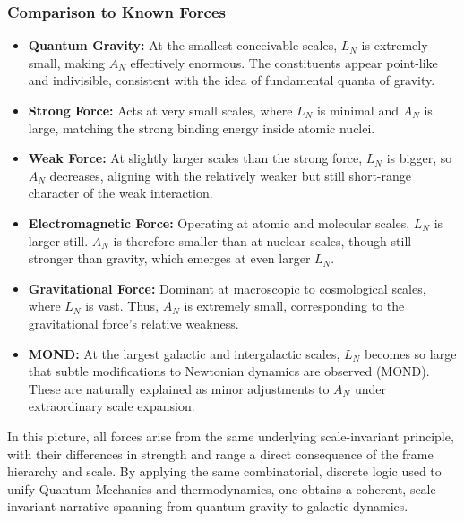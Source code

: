 \documentclass{article}
\begin{document}
\subsubsection*{Comparison to Known Forces}

\begin{itemize}
    \item \textbf{Quantum Gravity:}  
    At the smallest conceivable scales, $L_N$ is extremely small, making $A_N$ effectively enormous. The constituents appear point-like and indivisible, consistent with the idea of fundamental quanta of gravity.

    \item \textbf{Strong Force:}  
    Acts at very small scales, where $L_N$ is minimal and $A_N$ is large, matching the strong binding energy inside atomic nuclei.

    \item \textbf{Weak Force:}  
    At slightly larger scales than the strong force, $L_N$ is bigger, so $A_N$ decreases, aligning with the relatively weaker but still short-range character of the weak interaction.

    \item \textbf{Electromagnetic Force:}  
    Operating at atomic and molecular scales, $L_N$ is larger still. $A_N$ is therefore smaller than at nuclear scales, though still stronger than gravity, which emerges at even larger $L_N$.

    \item \textbf{Gravitational Force:}  
    Dominant at macroscopic to cosmological scales, where $L_N$ is vast. Thus, $A_N$ is extremely small, corresponding to the gravitational force’s relative weakness.

    \item \textbf{MOND:}  
    At the largest galactic and intergalactic scales, $L_N$ becomes so large that subtle modifications to Newtonian dynamics are observed (MOND). These are naturally explained as minor adjustments to $A_N$ under extraordinary scale expansion.
\end{itemize}

In this picture, all forces arise from the same underlying scale-invariant principle, with their differences in strength and range a direct consequence of the frame hierarchy and scale. By applying the same combinatorial, discrete logic used to unify Quantum Mechanics and thermodynamics, one obtains a coherent, scale-invariant narrative spanning from quantum gravity to galactic dynamics.
\end{document}
